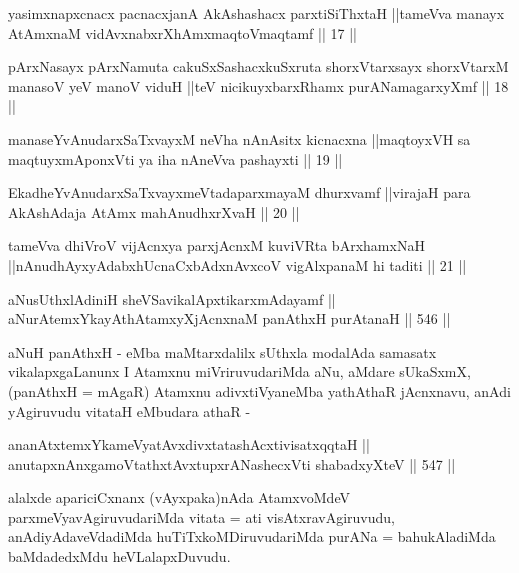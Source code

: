 \begin{shl}
yasimxnapxcnacx pacnacxjanA AkAshashacx parxtiSiThxtaH ||tameVva manayx AtAmxnaM vidAvxnabxrXhAmxmaqtoV\s maqtamf || 17 ||
\end{shl}

\begin{shl}
pArxNasayx pArxNamuta cakuSxSashacxkuSxruta shorxVtarxsayx shorxVtarxM manasoV yeV manoV viduH ||teV nicikuyxbarxRhamx purANamagarxyXmf || 18 ||
\end{shl}

\begin{shl}
manaseYvAnudarxSaTxvayxM neVha nAnAsitx kicnacxna ||maqtoyxVH sa maqtuyxmAponxVti ya iha nAneVva pashayxti || 19 ||
\end{shl}

\begin{shl}
EkadheYvAnudarxSaTxvayxmeVtadaparxmayaM dhurxvamf ||virajaH para AkAshAdaja AtAmx mahAnudhxrXvaH || 20 ||
\end{shl}

\begin{shl}
tameVva dhiVroV vijAcnxya parxjAcnxM kuviVRta bArxhamxNaH ||nAnudhAyxyAdabxhUcnaCxbAdxnAvxcoV vigAlxpanaM hi taditi || 21 ||
\end{shl}



\begin{shl}
aNusUthxlAdiniH sheVSavikalApxtikarxmAdayamf || \\
aNurAtemxYkayAthAtamxyXjAcnxnaM panAthxH purAtanaH \hfill || 546 ||  
\end{shl}

\begin{artha}
aNuH panAthxH - eMba maMtarxdalilx sUthxla modalAda samasatx
vikalapxgaLanunx I Atamxnu miVriruvudariMda aNu, aMdare sUkaSxmX,
(panAthxH = mAgaR) Atamxnu adivxtiVyaneMba yathAthaR jAcnxnavu, anAdi
yAgiruvudu vitataH eMbudara athaR -
\end{artha}

\begin{shl}
ananAtxtemxYkameVyatAvxdivxtatashAcxtivisatxqqtaH || \\
anutapxnAnxgamoVtathxtAvxtupxrANashecxVti shabadxyXteV \hfill || 547 ||  
\end{shl}

\begin{artha}
alalxde apariciCxnanx (vAyxpaka)nAda AtamxvoMdeV
parxmeVyavAgiruvudariMda vitata = ati visAtxravAgiruvudu,
anAdiyAdaveVdadiMda huTiTxkoMDiruvudariMda purANa = bahukAladiMda
baMdadedxMdu heVLalapxDuvudu.
\end{artha}

